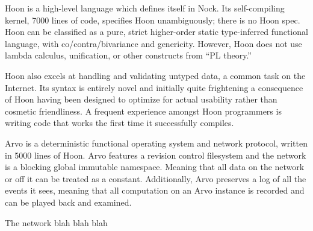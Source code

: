 Hoon is a high-level language which defines itself in Nock. Its self-compiling
kernel, 7000 lines of code, specifies Hoon unambiguously; there is no Hoon
spec. Hoon can be classified as a pure, strict higher-order static
type-inferred functional language, with co/contra/bivariance and genericity.
However, Hoon does not use lambda calculus, unification, or other constructs
from ``PL theory.'' 

Hoon also excels at handling and validating untyped data, a common task on the
Internet. Its syntax is entirely novel and initially quite frightening a
consequence of Hoon having been designed to optimize for actual usability
rather than cosmetic friendliness. A frequent experience amongst Hoon
programmers is writing code that works the first time it successfully compiles.

Arvo is a deterministic functional operating system and network protocol,
written in 5000 lines of Hoon. Arvo features a revision control filesystem and
the network is a blocking global immutable namespace. Meaning that all data on
the network or off it can be treated as a constant. Additionally, Arvo
preserves a log of all the events it sees, meaning that all computation on an
Arvo instance is recorded and can be played back and examined. 

The network blah blah blah
